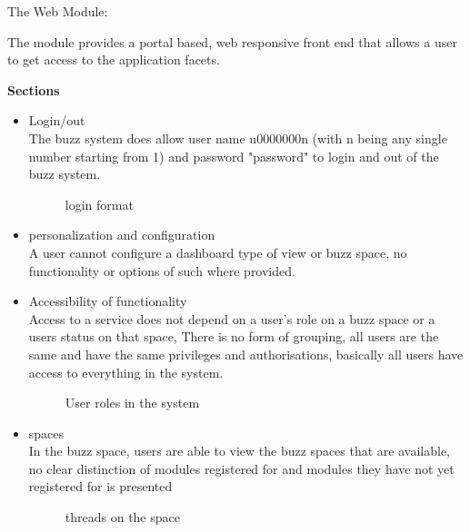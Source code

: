 \item  The Web Module:

The module provides a portal based, web responsive front end that allows a user to get access to the application facets.


\textbf{Sections}
\begin {itemize}


\item {Login/out}\\
The buzz system does allow user name u0000000n (with n being any single number starting from 1) and password "password" to login and out of the buzz system.

\begin{figure}[h!]
  \centering
  \caption{login format }
\end{figure}


\item personalization and configuration\\
A user cannot configure a dashboard type of view or buzz space, no functionality or options of such where provided.
\\

\item 	Accessibility of functionality\\
Access to a service does not depend on a user's role on a buzz space or a users status on that space, There is no form of grouping, all users are the same and have the same privileges and authorisations, basically all users have access to everything in the system.



\begin{figure}[h!]
  \centering
  \caption{User roles in the system }
\end{figure}

\item {spaces}\\
In the buzz space, users are able to view the buzz spaces that are available, no clear distinction of modules registered for and modules they have not yet registered for is presented\\

\begin{figure}[h!]
  \centering
  \caption{threads on the space }
\end{figure}



\end{itemize}
